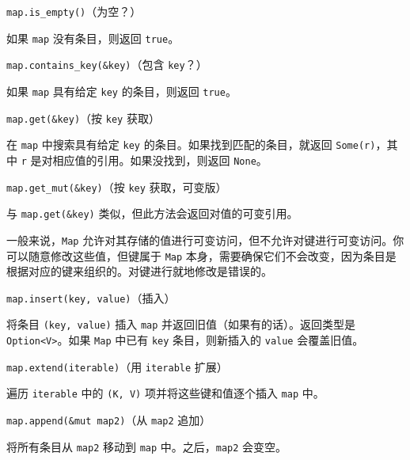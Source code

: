 \begin{mySidenote}
\texttt{map.is\_empty()}（为空？）
\end{mySidenote}

如果 \texttt{map} 没有条目，则返回 \texttt{true}。

\begin{myNote}
\texttt{map.contains\_key(\&key)}（包含 \texttt{key}？）
\end{myNote}

如果 \texttt{map} 具有给定 \texttt{key} 的条目，则返回 \texttt{true}。

\begin{mySidenote}
\texttt{map.get(\&key)}（按 \texttt{key} 获取）
\end{mySidenote}

在 \texttt{map} 中搜索具有给定 \texttt{key} 的条目。如果找到匹配的条目，就返回 \texttt{Some(r)}，其中 \texttt{r} 是对相应值的引用。如果没找到，则返回 \texttt{None}。

\begin{myNote}
\texttt{map.get\_mut(\&key)}（按 \texttt{key} 获取，可变版）
\end{myNote}

与 \texttt{map.get(\&key)} 类似，但此方法会返回对值的可变引用。

一般来说，\texttt{Map} 允许对其存储的值进行可变访问，但不允许对键进行可变访问。你可以随意修改这些值，但键属于 \texttt{Map} 本身，需要确保它们不会改变，因为条目是根据对应的键来组织的。对键进行就地修改是错误的。

\begin{mySidenote}
\texttt{map.insert(key, value)}（插入）
\end{mySidenote}

将条目 \texttt{(key, value)} 插入 \texttt{map} 并返回旧值（如果有的话）。返回类型是 \texttt{Option<V>}。如果 \texttt{Map} 中已有 \texttt{key} 条目，则新插入的 \texttt{value} 会覆盖旧值。

\begin{myNote}
\texttt{map.extend(iterable)}（用 \texttt{iterable} 扩展）
\end{myNote}

遍历 \texttt{iterable} 中的 \texttt{(K, V)} 项并将这些键和值逐个插入 \texttt{map} 中。

\begin{myNote}
\texttt{map.append(\&mut map2)}（从 \texttt{map2} 追加）
\end{myNote}

将所有条目从 \texttt{map2} 移动到 \texttt{map} 中。之后，\texttt{map2} 会变空。


